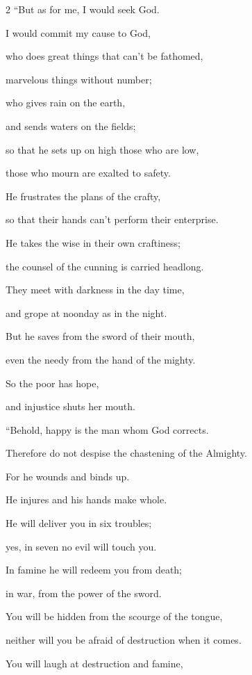 \begin{multicols}{2}
	\myverse{}“But as for me, I would seek God.
	
	I would commit my cause to God,
	
	\myverse{}who does great things that can’t be fathomed,
	
	marvelous things without number;
	
	\myverse{}who gives rain on the earth,
	
	and sends waters on the fields;
	
	\myverse{}so that he sets up on high those who are low,
	
	those who mourn are exalted to safety.
	
	\myverse{}He frustrates the plans of the crafty,
	
	so that their hands can’t perform their enterprise.
	
	\myverse{}He takes the wise in their own craftiness;
	
	the counsel of the cunning is carried headlong.
	
	\myverse{}They meet with darkness in the day time,
	
	and grope at noonday as in the night.
	
	\myverse{}But he saves from the sword of their mouth,
	
	even the needy from the hand of the mighty.
	
	\myverse{}So the poor has hope,
	
	and injustice shuts her mouth.
	
	\vspace{\baselineskip}
	
	\myverse{}“Behold, happy is the man whom God corrects.
	
	Therefore do not despise the chastening of the Almighty.
	
	\myverse{}For he wounds and binds up.
	
	He injures and his hands make whole.
	
	\myverse{}He will deliver you in six troubles;
	
	yes, in seven no evil will touch you.
	
	\myverse{}In famine he will redeem you from death;
	
	in war, from the power of the sword.
	
	\myverse{}You will be hidden from the scourge of the tongue,
	
	neither will you be afraid of destruction when it comes.
	
	\myverse{}You will laugh at destruction and famine,
	

\end{multicols}
